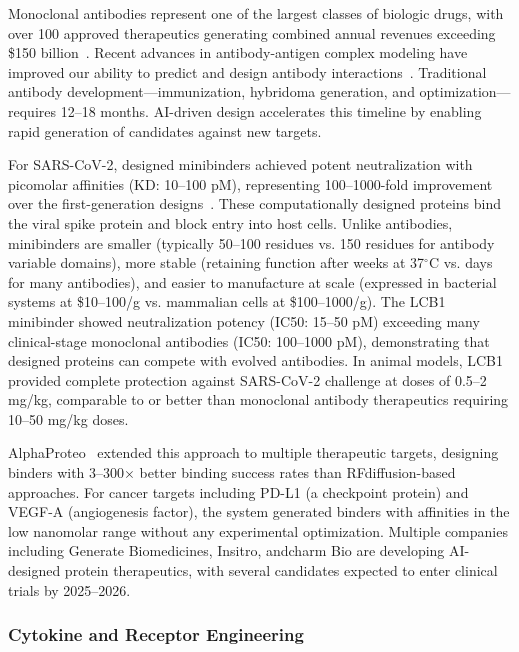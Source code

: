 Monoclonal antibodies represent one of the largest classes of biologic drugs, with over 100 approved therapeutics generating combined annual revenues exceeding \$150 billion~\cite{raybould2019developability}. Recent advances in antibody-antigen complex modeling have improved our ability to predict and design antibody interactions~\cite{kenlay2024antibody,huang2024antibody}. Traditional antibody development---immunization, hybridoma generation, and optimization---requires 12--18 months. AI-driven design accelerates this timeline by enabling rapid generation of candidates against new targets.

For SARS-CoV-2, designed minibinders achieved potent neutralization with picomolar affinities (KD: 10--100 pM), representing 100--1000-fold improvement over the first-generation designs~\cite{watson2023rfdiffusion}. These computationally designed proteins bind the viral spike protein and block entry into host cells. Unlike antibodies, minibinders are smaller (typically 50--100 residues vs. 150 residues for antibody variable domains), more stable (retaining function after weeks at 37$^\circ$C vs. days for many antibodies), and easier to manufacture at scale (expressed in bacterial systems at \$10--100/g vs. mammalian cells at \$100--1000/g). The LCB1 minibinder showed neutralization potency (IC50: 15--50 pM) exceeding many clinical-stage monoclonal antibodies (IC50: 100--1000 pM), demonstrating that designed proteins can compete with evolved antibodies. In animal models, LCB1 provided complete protection against SARS-CoV-2 challenge at doses of 0.5--2 mg/kg, comparable to or better than monoclonal antibody therapeutics requiring 10--50 mg/kg doses.

AlphaProteo~\citep{zambaldi2024alphaproteo} extended this approach to multiple therapeutic targets, designing binders with 3--300$\times$ better binding success rates than RFdiffusion-based approaches. For cancer targets including PD-L1 (a checkpoint protein) and VEGF-A (angiogenesis factor), the system generated binders with affinities in the low nanomolar range without any experimental optimization. Multiple companies including Generate Biomedicines, Insitro, andcharm Bio are developing AI-designed protein therapeutics, with several candidates expected to enter clinical trials by 2025--2026.

\subsubsection{Cytokine and Receptor Engineering}

